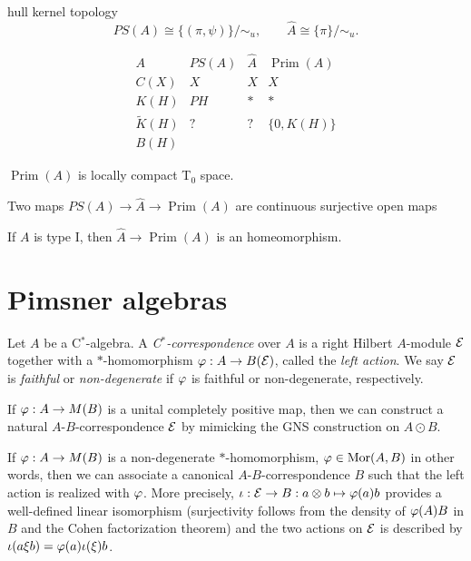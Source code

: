 \documentclass{../../large}
\newcommand{\Prim}{\operatorname{Prim}}
\begin{document}
\begin{prb}
hull kernel topology
\[PS(A)\cong\{(\pi,\psi)\}/\sim_u,\qquad\hat A\cong\{\pi\}/\sim_u.\]

\[\begin{array}{c|ccc}
A & PS(A) & \hat A & \Prim(A) \\\hline
C(X) & X & X & X \\
K(H) & PH & * & * \\
\tilde K(H) & ? & ? & \{0,K(H)\} \\
B(H) &&&
\end{array}\]
\begin{parts}
\item $\Prim(A)$ is locally compact T$_0$ space.
\item Two maps $PS(A)\to\hat A\to\Prim(A)$ are continuous surjective open maps
\item If $A$ is type I, then $\hat A\to\Prim(A)$ is an homeomorphism.
\end{parts}

\end{prb}

\begin{prb}
\end{prb}





\section{Pimsner algebras}


\begin{prb}[C$^*$-correspondences]
Let $A$ be a C$^*$-algebra.
A \emph{C$^*$-correspondence} over $A$ is a right Hilbert $A$-module $\mathcal{E}$ together with a $*$-homomorphism $\varphi:A\to B(\mathcal{E})$, called the \emph{left action}.
We say $\mathcal{E}$ is \emph{faithful} or \emph{non-degenerate} if $\varphi$ is faithful or non-degenerate, respectively.
\begin{parts}
\item If $\varphi:A\to M(B)$ is a unital completely positive map, then we can construct a natural $A$-$B$-correspondence $\mathcal{E}$ by mimicking the GNS construction on $A\odot B$.
\item If $\varphi:A\to M(B)$ is a non-degenerate $*$-homomorphism, $\varphi\in\operatorname{Mor}(A,B)$ in other words, then we can associate a canonical $A$-$B$-correspondence $B$ such that the left action is realized with $\varphi$.
More precisely, $\iota:\mathcal{E}\to B:a\otimes b\mapsto\varphi(a)b$ provides a well-defined linear isomorphism (surjectivity follows from the density of $\varphi(A)B$ in $B$ and the Cohen factorization theorem) and the two actions on $\mathcal{E}$ is described by $\iota(a\xi b)=\varphi(a)\iota(\xi)b$.
\end{parts}
\end{prb}
\end{document}
